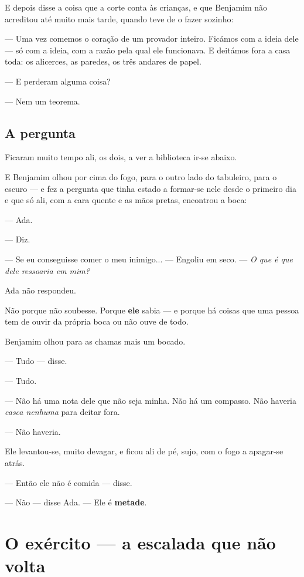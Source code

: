 \documentclass[livro.tex]{subfiles}
\begin{document}
\medskip

E depois disse a coisa que a corte conta às crianças, e que Benjamim não acreditou até muito mais tarde, quando
teve de o fazer sozinho:

--- Uma vez comemos o coração de um provador inteiro. Ficámos com a ideia dele --- só com a ideia, com a razão pela
qual ele funcionava. E deitámos fora a casa toda: os alicerces, as paredes, os três andares de papel.

--- E perderam alguma coisa?

--- Nem um teorema.

\section*{A pergunta}

Ficaram muito tempo ali, os dois, a ver a biblioteca ir-se abaixo.

E Benjamim olhou por cima do fogo, para o outro lado do tabuleiro, para o escuro --- e fez a pergunta que tinha
estado a formar-se nele desde o primeiro dia e que só ali, com a cara quente e as mãos pretas, encontrou a boca:

--- Ada.

--- Diz.

--- Se eu conseguisse comer o meu inimigo... --- Engoliu em seco. --- \emph{O que é que dele ressoaria em mim?}

\medskip

Ada não respondeu.

Não porque não soubesse. Porque \textbf{ele} sabia --- e porque há coisas que uma pessoa tem de ouvir da própria
boca ou não ouve de todo.

\medskip

Benjamim olhou para as chamas mais um bocado.

--- Tudo --- disse.

--- Tudo.

--- Não há uma nota dele que não seja minha. Não há um compasso. Não haveria \emph{casca nenhuma} para deitar
fora.

--- Não haveria.

\medskip

Ele levantou-se, muito devagar, e ficou ali de pé, sujo, com o fogo a apagar-se atrás.

--- Então ele não é comida --- disse.

--- Não --- disse Ada. --- Ele é \textbf{metade}.


\chapter{O exército --- a escalada que não volta}
\end{document}
